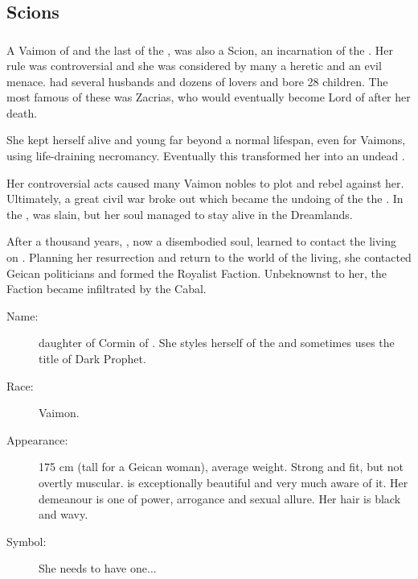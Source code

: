 \part{\Humans}
\chapter{Scions}
\section{\Belzir}
\index{\Belzir}
A Vaimon of \ClanGeican and the last \Calipha of the \VaimonCaliphate, \Belzir{} was also a Scion, an incarnation of the \Malach{} \Shiaraid. Her rule was controversial and she was considered by many a heretic and an evil menace. \Belzir{} had several husbands and dozens of lovers and bore 28 children. The most famous of these was Zacrias, who would eventually become Lord of \ClanGeican after her death. 

She kept herself alive and young far beyond a normal lifespan, even for Vaimons, using life-draining necromancy. Eventually this transformed her into an undead \Reaver. 

Her controversial acts caused many Vaimon nobles to plot and rebel against her. Ultimately, a great civil war broke out which became the undoing of the \VaimonCaliphate\dash the \darkfall. In the \darkfall{}, \Belzir{} was slain, but her soul managed to stay alive in the Dreamlands. 

After a thousand years, \Belzir{}, now a disembodied soul, learned to  contact the living on \Miith{}. Planning her resurrection and return to the world of the living, she contacted Geican politicians and formed the Royalist Faction. Unbeknownst to her, the Faction became infiltrated by the Cabal. 

\begin{description}
  \item[Name:] {\Belzir} daughter of {Cormin} of \ClanGeican. She styles herself \Calipha of the \VaimonCaliphate and sometimes uses the title of Dark Prophet. 
  \item[Race:] Vaimon. 
  \item[Appearance:] 175 cm (tall for a Geican woman), average weight. Strong and fit, but not overtly muscular. \Belzir{} is exceptionally beautiful and very much aware of it. Her demeanour is one of power, arrogance and sexual allure. Her hair is black and wavy. 
  \item[Symbol:] She needs to have one... 
\end{description}









